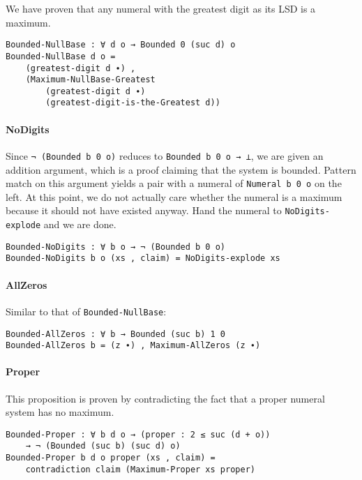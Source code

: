 \documentclass[\main/thesis.tex]{subfiles}
\begin{document}
We have proven that any numeral with the greatest digit as its LSD is a maximum.

\begin{lstlisting}
Bounded-NullBase : ∀ d o → Bounded 0 (suc d) o
Bounded-NullBase d o =
    (greatest-digit d ∙) ,
    (Maximum-NullBase-Greatest
        (greatest-digit d ∙)
        (greatest-digit-is-the-Greatest d))
\end{lstlisting}

\paragraph{NoDigits}

Since {\lstinline|¬ (Bounded b 0 o)|} reduces to {\lstinline|Bounded b 0 o → ⊥|},
we are given an addition argument, which is a proof claiming that the system is
bounded.
Pattern match on this argument yields a pair with a numeral of {\lstinline|Numeral b 0 o|} on the left.
At this point, we do not actually care whether the numeral is a maximum
because it should not have existed anyway.
Hand the numeral to {\lstinline|NoDigits-explode|} and we are done.

\begin{lstlisting}
Bounded-NoDigits : ∀ b o → ¬ (Bounded b 0 o)
Bounded-NoDigits b o (xs , claim) = NoDigits-explode xs
\end{lstlisting}

\paragraph{AllZeros}

Similar to that of {\lstinline|Bounded-NullBase|}:

\begin{lstlisting}
Bounded-AllZeros : ∀ b → Bounded (suc b) 1 0
Bounded-AllZeros b = (z ∙) , Maximum-AllZeros (z ∙)
\end{lstlisting}

\paragraph{Proper}

This proposition is proven by contradicting the fact that
a proper numeral system has no maximum.

\begin{lstlisting}
Bounded-Proper : ∀ b d o → (proper : 2 ≤ suc (d + o))
    → ¬ (Bounded (suc b) (suc d) o)
Bounded-Proper b d o proper (xs , claim) =
    contradiction claim (Maximum-Proper xs proper)
\end{lstlisting}
\end{document}
